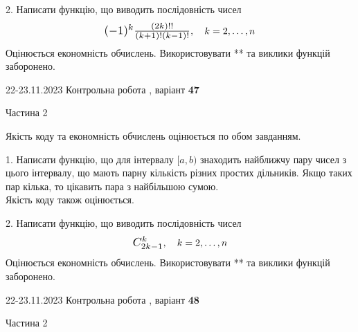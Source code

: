 \documentclass[12pt, ukrainian]{article}
\begin{document}
{{{{{{{{{{{{{{{{{{\begin {Large}
\vspace{10mm}



2. 
Написати функцію, що виводить послідовність чисел
$$\scalebox{1.2}{$(-1)^{k}\frac{(2k)!!}{(k+1)!(k-1)!}$}, \quad k=2,\ldots,n$$
Оцінюється економність обчислень. Використовувати ** та виклики функцій заборонено.

\end{Large}\newpage




\begin {Huge}
{{22-23.11.2023 Контрольна робота , варіант  \No \textbf { 47 }\par}}

\begin{center}Частина 2
\end{center}
\vspace{10mm}
\end {Huge}

{
\begin {Large}
Якість коду та економність обчислень оцінюється по обом завданням.

\vspace{5mm}

1. Написати функцію, що для інтервалу $[a, b)$ знаходить найближчу пару чисел з цього інтервалу, що мають парну кількість різних простих дільників. Якщо таких пар кілька, то цікавить пара з найбільшою сумою.\\	Якість коду також оцінюється. 



\vspace{10mm}



2. 
Написати функцію, що виводить послідовність чисел
$$\scalebox{1.2}{$C_{2k-1}^{k}$}, \quad k=2,\ldots,n$$
Оцінюється економність обчислень. Використовувати ** та виклики функцій заборонено.

\end{Large}\newpage




\begin {Huge}
{{22-23.11.2023 Контрольна робота , варіант  \No \textbf { 48 }\par}}

\begin{center}Частина 2
\end{center}
\vspace{10mm}
\end {Huge}

}}}}}}}}}}}}}}}}}}}
\end{document}
